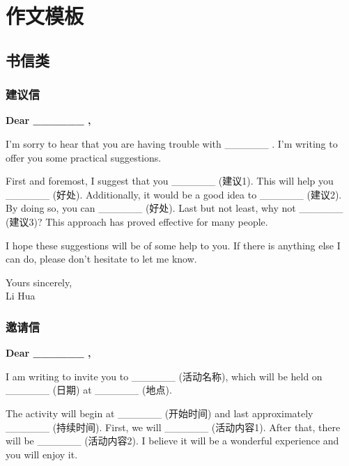 \section{作文模板}

\subsection{书信类}

\subsubsection{建议信}

\begin{center}
\textbf{Dear \_\_\_\_\_\_ ,}
\end{center}

I'm sorry to hear that you are having trouble with \_\_\_\_\_\_ . I'm writing to offer you some practical suggestions.

First and foremost, I suggest that you \_\_\_\_\_\_ (建议1). This will help you \_\_\_\_\_\_ (好处). Additionally, it would be a good idea to \_\_\_\_\_\_ (建议2). By doing so, you can \_\_\_\_\_\_ (好处). Last but not least, why not \_\_\_\_\_\_ (建议3)? This approach has proved effective for many people.

I hope these suggestions will be of some help to you. If there is anything else I can do, please don't hesitate to let me know.

\begin{center}
Yours sincerely,\\
Li Hua
\end{center}

\subsubsection{邀请信}

\begin{center}
\textbf{Dear \_\_\_\_\_\_ ,}
\end{center}

I am writing to invite you to \_\_\_\_\_\_ (活动名称), which will be held on \_\_\_\_\_\_ (日期) at \_\_\_\_\_\_ (地点).

The activity will begin at \_\_\_\_\_\_ (开始时间) and last approximately \_\_\_\_\_\_ (持续时间). First, we will \_\_\_\_\_\_ (活动内容1). After that, there will be \_\_\_\_\_\_ (活动内容2). I believe it will be a wonderful experience and you will enjoy it.

